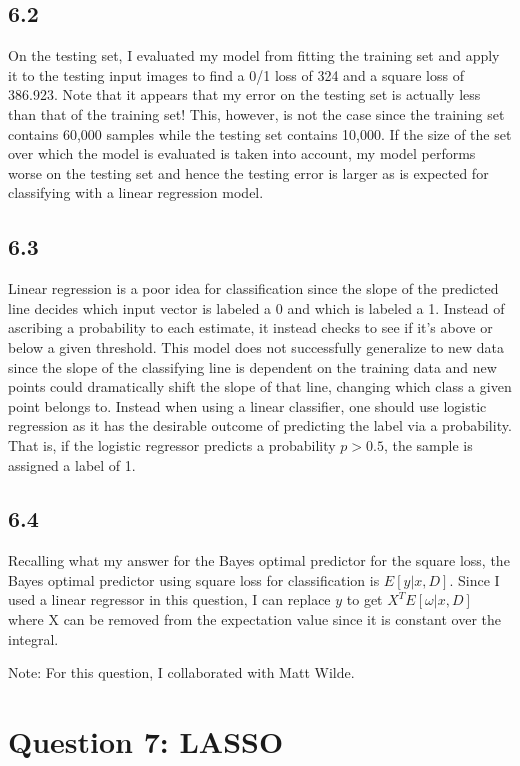 \documentclass[12pt]{amsart}
\begin{document}
\subsection*{6.2}
On the testing set, I evaluated my model from fitting the training set and apply it to the testing input images to find a 0/1 loss of 324 and a square loss of 386.923.  Note that it appears that my error on the testing set is actually less than that of the training set!  This, however, is not the case since the training set contains 60,000 samples while the testing set contains 10,000.  If the size of the set over which the model is evaluated is taken into account, my model performs worse on the testing set and hence the testing error is larger as is expected for classifying with a linear regression model.

\subsection*{6.3}
Linear regression is a poor idea for classification since the slope of the predicted line decides which input vector is labeled a 0 and which is labeled a 1.  Instead of ascribing a probability to each estimate, it instead checks to see if it's above or below a given threshold.  This model does not successfully generalize to new data since the slope of the classifying line is dependent on the training data and new points could dramatically shift the slope of that line, changing which class a given point belongs to.  Instead when using a linear classifier, one should use logistic regression as it has the desirable outcome of predicting the label via a probability.  That is, if the logistic regressor predicts a probability $p > 0.5$, the sample is assigned a label of 1.

\subsection*{6.4}

Recalling what my answer for the Bayes optimal predictor for the square loss, the Bayes optimal predictor using square loss for classification is $E[y|x,D]$.  Since I used a linear regressor in this question, I can replace $y$ to get $X^TE[\omega|x,D]$ where X can be removed from the expectation value since it is constant over the integral.

Note: For this question, I collaborated with Matt Wilde.


\section*{Question 7: LASSO}
\end{document}
